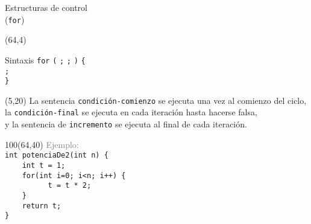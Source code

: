 \documentclass[aspectratio=169]{beamer}
\begin{document}
\begin{frame}[fragile,t]{Estructuras de control\\ (\texttt{for})}
    \begin{textblock}{90}(64,4)
    \begin{block}{\small Sintaxis}
    \vspace{0.2cm}
    \scriptsize
    {\large \texttt{for}} {\large \texttt{(}}
     {\large \texttt{;}}
     {\large \texttt{;}}
     {\large \texttt{)}} {\large \texttt{\{}}\\ \vspace{0.2cm}
    \hspace{2cm}  {\large \texttt{;}}\\ \vspace{0.2cm}
    \hspace{1cm} {\large \texttt{\}}}
    \end{block}
    \end{textblock}
    \begin{textblock}{50}(5,20)
    \small
    La sentencia \texttt{condición-comienzo} se ejecuta una vez al comienzo del ciclo,\\
    \bigskip
    la \texttt{condición-final} se ejecuta en cada iteración hasta hacerse falsa,\\
    \bigskip
    y la sentencia de \texttt{incremento} se ejecuta al final de cada iteración.
    \end{textblock}
    \begin{textblock}{100}(64,40)
    \textcolor{gray}{Ejemplo:}\\
    \bigskip
    \normalsize \verb|int potenciaDe2(int n) {|\\
    \normalsize \verb|    int t = 1;|\\
    \normalsize \verb|    for(int i=0; i<n; i++) {|\\
    \normalsize \verb|          t = t * 2;|\\
    \normalsize \verb|    }|\\
    \normalsize \verb|    return t;|\\
    \normalsize \verb|}|\\
    \end{textblock}
\end{frame}
\end{document}
